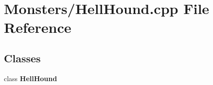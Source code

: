 \section{Monsters/\-Hell\-Hound.cpp File Reference}
\label{_hell_hound_8cpp}
\subsection*{Classes}
\begin{DoxyCompactItemize}
\item 
class {\bf Hell\-Hound}
\end{DoxyCompactItemize}
